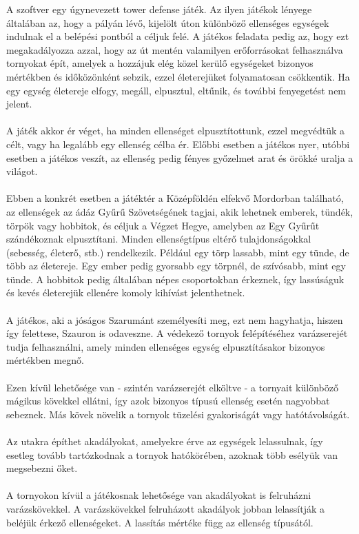 A szoftver egy úgynevezett tower defense játék. Az ilyen játékok lényege általában az, hogy a pályán lévő, kijelölt úton különböző ellenséges egységek indulnak el a belépési pontból a céljuk felé. A játékos feladata pedig az, hogy ezt megakadályozza azzal, hogy az út mentén valamilyen erőforrásokat felhasználva tornyokat épít, amelyek a hozzájuk elég közel kerülő egységeket bizonyos mértékben és időközönként sebzik, ezzel életerejüket folyamatosan csökkentik. Ha egy egység életereje elfogy, megáll, elpusztul, eltűnik, és további fenyegetést nem jelent. \\ \\
A játék akkor ér véget, ha minden ellenséget elpusztítottunk, ezzel megvédtük a célt, vagy ha legalább egy ellenség célba ér. Előbbi esetben a játékos nyer, utóbbi esetben a játékos veszít, az ellenség pedig fényes győzelmet arat és örökké uralja a világot. \\ \\
Ebben a konkrét esetben a játéktér a Középföldén elfekvő Mordorban található, az ellenségek az ádáz Gyűrű Szövetségének tagjai, akik lehetnek emberek, tündék, törpök vagy hobbitok, és céljuk a Végzet Hegye, amelyben az Egy Gyűrűt szándékoznak elpusztítani. Minden ellenségtípus eltérő tulajdonságokkal (sebesség, életerő, stb.) rendelkezik. Például egy törp lassabb, mint egy tünde, de több az életereje. Egy ember pedig gyorsabb egy törpnél, de szívósabb, mint egy tünde. A hobbitok pedig általában népes csoportokban érkeznek, így lassúságuk és kevés életerejük ellenére komoly kihívást jelenthetnek. \\ \\
A játékos, aki a jóságos Szarumánt személyesíti meg, ezt nem hagyhatja, hiszen így felettese, Szauron is odaveszne. A védekező tornyok felépítéséhez varázserejét tudja felhasználni, amely minden ellenséges egység elpusztításakor bizonyos mértékben megnő. \\ \\
Ezen kívül lehetősége van - szintén varázserejét elköltve - a tornyait különböző mágikus kövekkel ellátni, így azok bizonyos típusú ellenség esetén nagyobbat sebeznek. Más kövek növelik a tornyok tüzelési gyakoriságát vagy hatótávolságát. \\ \\
Az utakra építhet akadályokat, amelyekre érve az egységek lelassulnak, így esetleg tovább tartózkodnak a tornyok hatókörében, azoknak több esélyük van megsebezni őket. \\ \\
A tornyokon kívül a játékosnak lehetősége van akadályokat is felruházni varázskövekkel. A varázskövekkel felruházott akadályok jobban lelassítják a beléjük érkező ellenségeket. A lassítás mértéke függ az ellenség típusától. \\ \\
